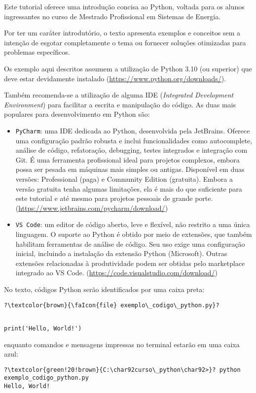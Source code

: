 

Este tutorial oferece uma introdução concisa ao Python, voltada para os alunos ingressantes no curso de Mestrado
Profissional em Sistemas de Energia.

Por ter um caráter introdutório, o texto apresenta exemplos e conceitos sem a intenção de esgotar completamente o
tema ou fornecer soluções otimizadas para problemas específicos.

Os exemplo aqui descritos assumem a utilização de Python 3.10 (ou superior) que deve estar devidamente instalado (\url{https://www.python.org/downloads/}).

Também recomenda-se a utilização de alguma IDE (\emph{Integrated Development Environment}) para facilitar a escrita e manipulação do código.
As duas mais populares para desenvolvimento em Python são:
\begin{itemize}
    \item \texttt{PyCharm}: uma IDE dedicada ao Python, desenvolvida pela JetBrains.
    Oferece uma configuração padrão robusta e inclui funcionalidades como autocomplete, análise de código, refatoração,
    debugging, testes integrados e integração com Git.
    É uma ferramenta profissional ideal para projetos complexos, embora possa ser pesada em máquinas mais simples ou antigas.
    Disponível em duas versões: Professional (paga) e Community Edition (gratuita).
    Embora a versão gratuita tenha algumas limitações, ela é mais do que suficiente para este tutorial e até mesmo para projetos pessoais de grande porte.
    (\url{https://www.jetbrains.com/pycharm/download/})
    \item \texttt{VS Code}: um editor de código aberto, leve e flexível, não restrito a uma única linguagem.
    O suporte ao Python é obtido por meio de extensões, que também habilitam ferramentas de análise de código.
    Seu uso exige uma configuração inicial, incluindo a instalação da extensão Python (Microsoft).
    Outras extensões relacionadas à produtividade podem ser obtidas pelo marketplace integrado ao VS Code.
    (\url{https://code.visualstudio.com/download/})
\end{itemize}


No texto, códigos Python serão identificados por uma caixa preta:
\begin{verbatim}
?\textcolor{brown}{\faIcon{file} exemplo\_codigo\_python.py}?
\end{verbatim}
\vspace{-0.8em}
%
\begin{verbatim}

print('Hello, World!')
\end{verbatim}

enquanto comandos e mensagens impressas no terminal estarão em uma caixa azul:
\begin{verbatim}
?\textcolor{green!20!brown}{C:\char92curso\_python\char92>}? python exemplo_codigo_python.py
Hello, World!
\end{verbatim}